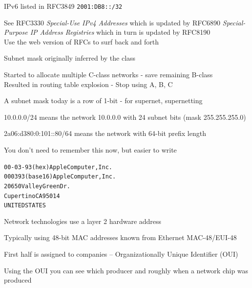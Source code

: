 \documentclass[Screen16to9,17pt]{foils}
\begin{document}
IPv6 listed in RFC3849 \verb+2001:DB8::/32+

See RFC3330 \emph{Special-Use IPv4 Addresses} which is updated by
RFC6890 \emph{Special-Purpose IP Address Registries} which in turn is updated by RFC8190\\
Use the web version of RFCs to surf back and forth 




\begin{list2}
\item Subnet mask originally inferred by the class
\item Started to allocate multiple C-class networks - save remaining B-class\\
Resulted in routing table explosion - Stop using A, B, C
\item A subnet mask today is a row of 1-bit - for supernet, supernetting
\item 10.0.0.0/24 means the network 10.0.0.0 with 24 subnet bits (mask 255.255.255.0)
\item 2a06:d380:0:101::80/64 means the network with 64-bit prefix length
\item You don't need to remember this now, but easier to write
\end{list2}






\begin{alltt}
00-03-93   (hex)        Apple Computer, Inc.
000393     (base 16)    Apple Computer, Inc.
                        20650 Valley Green Dr.
                        Cupertino CA 95014
                        UNITED STATES
\end{alltt}
\begin{list1}
\item Network technologies use a layer 2 hardware address
\item Typically using 48-bit MAC addresses known from Ethernet MAC-48/EUI-48
\item First half is assigned to companies -- Organizationally Unique Identifier (OUI)
\item Using the OUI you can see which producer and roughly when a network chip was produced
\item {}
\end{list1}
\end{document}

